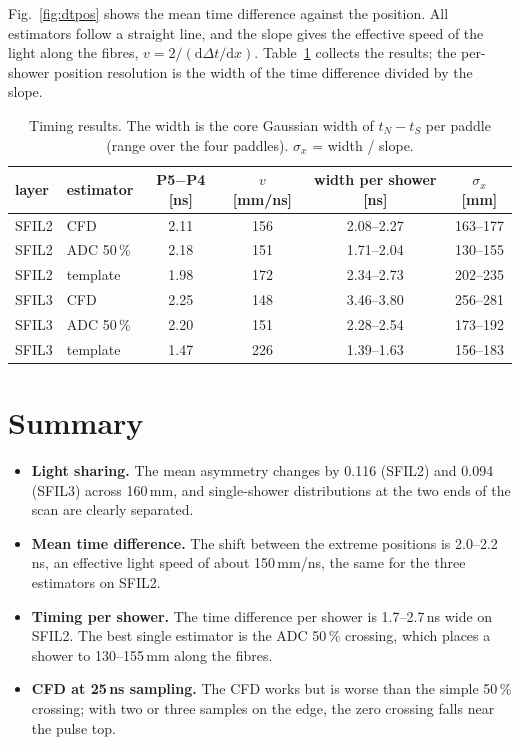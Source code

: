 \documentclass[11pt]{article}
\begin{document}
Fig.~\ref{fig:dtpos} shows the mean time difference against the position. All estimators follow a straight line,
and the slope gives the effective speed of the light along the fibres, $v = 2/(\mathrm{d}\Delta t/\mathrm{d}x)$.
Table~\ref{tab:timing} collects the results; the per-shower position resolution is the width of the time
difference divided by the slope.

\begin{table}[H]
\centering
\begin{tabular}{llcccc}
\toprule
layer & estimator & P5$-$P4 [ns] & $v$ [mm/ns] & width per shower [ns] & $\sigma_x$ [mm] \\
\midrule
SFIL2 & CFD             & 2.11 & 156 & 2.08--2.27 & 163--177 \\
SFIL2 & ADC 50\,\%      & 2.18 & 151 & 1.71--2.04 & 130--155 \\
SFIL2 & template        & 1.98 & 172 & 2.34--2.73 & 202--235 \\
SFIL3 & CFD             & 2.25 & 148 & 3.46--3.80 & 256--281 \\
SFIL3 & ADC 50\,\%      & 2.20 & 151 & 2.28--2.54 & 173--192 \\
SFIL3 & template        & 1.47 & 226 & 1.39--1.63 & 156--183 \\
\bottomrule
\end{tabular}
\caption{Timing results. The width is the core Gaussian width of $t_N - t_S$ per paddle (range over the four
paddles). $\sigma_x$ = width / slope.}
\label{tab:timing}
\end{table}

\section*{Summary}

\begin{itemize}
  \item \textbf{Light sharing.} The mean asymmetry changes by 0.116 (SFIL2) and 0.094 (SFIL3) across 160\,mm,
        and single-shower distributions at the two ends of the scan are clearly separated.
  \item \textbf{Mean time difference.} The shift between the extreme positions is 2.0--2.2\,ns, an effective
        light speed of about 150\,mm/ns, the same for the three estimators on SFIL2.
  \item \textbf{Timing per shower.} The time difference per shower is 1.7--2.7\,ns wide on SFIL2. The best
        single estimator is the ADC 50\,\% crossing, which places a shower to 130--155\,mm along the fibres.
  \item \textbf{CFD at 25\,ns sampling.} The CFD works but is worse than the simple 50\,\% crossing; with two
        or three samples on the edge, the zero crossing falls near the pulse top.
\end{itemize}
\end{document}
